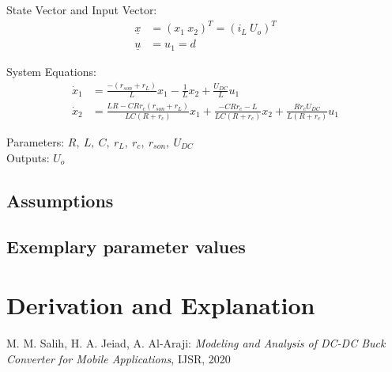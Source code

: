 \documentclass[10pt,a4paper]{article}
\begin{document}
	State Vector and Input Vector:
	\begin{align*}
		\underline{x} &= (x_1 \ x_2)^T= (i_L \ U_o)^T \\
		\underline{u} &= u_1 = d
	\end{align*}

	\noindent System Equations:		
	\begin{subequations}
	\begin{align}
		\dot{x}_1 &= \frac{-(r_{son} + r_L)}{L} x_1 - \frac{1}{L} x_2 
					+ \frac{U_{DC}}{L} u_1	\\      
		\dot{x}_2 &= \frac{LR - CRr_c(r_{son} + r_L)}{LC(R + r_c)} x_1 
					+ \frac{-CRr_c - L}{LC(R + r_c)} x_2 
					+ \frac{Rr_cU_{DC}}{L(R + r_c)}	u_1		
	\end{align}
	\end{subequations}

	\noindent
	Parameters: $R, ~L, ~C, ~r_L, ~r_c, ~r_{son}, ~U_{DC}$ %
	\\
	Outputs: $U_o$ %
	
	
	\subsection{Assumptions} %
	
	
	\subsection{Exemplary parameter values}
	

	
	\section{Derivation and Explanation} %
	
	
	\begin{thebibliography}{10}		
		M. M. Salih, H. A. Jeiad, A. Al-Araji: 
		\textit{Modeling and Analysis of DC-DC Buck Converter for Mobile Applications}, IJSR, 2020
	\end{thebibliography}
\end{document}
